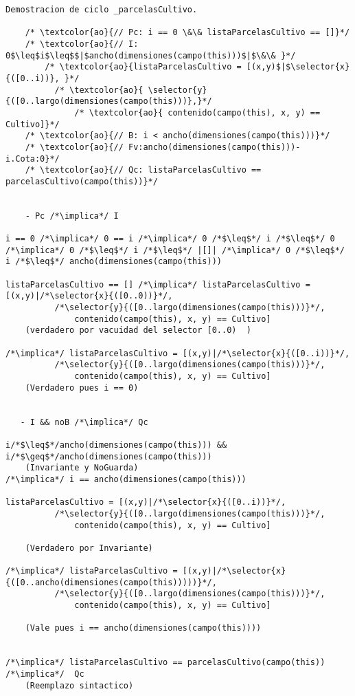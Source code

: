 \begin{lstlisting}
Demostracion de ciclo _parcelasCultivo.

    /* \textcolor{ao}{// Pc: i == 0 \&\& listaParcelasCultivo == []}*/        
  	/* \textcolor{ao}{// I: 0$\leq$i$\leq$$|$ancho(dimensiones(campo(this)))$|$\&\& }*/
    	/* \textcolor{ao}{listaParcelasCultivo = [(x,y)$|$\selector{x}{([0..i))}, }*/		
  		  /* \textcolor{ao}{ \selector{y}{([0..largo(dimensiones(campo(this)))},}*/		
    		  /* \textcolor{ao}{ contenido(campo(this), x, y) == Cultivo]}*/
    /* \textcolor{ao}{// B: i < ancho(dimensiones(campo(this)))}*/
    /* \textcolor{ao}{// Fv:ancho(dimensiones(campo(this)))-i.Cota:0}*/
    /* \textcolor{ao}{// Qc: listaParcelasCultivo == parcelasCultivo(campo(this))}*/    


    - Pc /*\implica*/ I
    
i == 0 /*\implica*/ 0 == i /*\implica*/ 0 /*$\leq$*/ i /*$\leq$*/ 0
/*\implica*/ 0 /*$\leq$*/ i /*$\leq$*/ |[]| /*\implica*/ 0 /*$\leq$*/ i /*$\leq$*/ ancho(dimensiones(campo(this)))

listaParcelasCultivo == [] /*\implica*/ listaParcelasCultivo = [(x,y)|/*\selector{x}{([0..0))}*/,	
  		  /*\selector{y}{([0..largo(dimensiones(campo(this)))}*/,
    		  contenido(campo(this), x, y) == Cultivo]
    (verdadero por vacuidad del selector [0..0)  )
    
/*\implica*/ listaParcelasCultivo = [(x,y)|/*\selector{x}{([0..i))}*/,	
  		  /*\selector{y}{([0..largo(dimensiones(campo(this)))}*/,
    		  contenido(campo(this), x, y) == Cultivo]
    (Verdadero pues i == 0)
    

   - I && noB /*\implica*/ Qc
   
i/*$\leq$*/ancho(dimensiones(campo(this))) &&  i/*$\geq$*/ancho(dimensiones(campo(this)))
	(Invariante y NoGuarda)
/*\implica*/ i == ancho(dimensiones(campo(this)))

listaParcelasCultivo = [(x,y)|/*\selector{x}{([0..i))}*/,	
  		  /*\selector{y}{([0..largo(dimensiones(campo(this)))}*/,
    		  contenido(campo(this), x, y) == Cultivo]
    
    (Verdadero por Invariante)
    
/*\implica*/ listaParcelasCultivo = [(x,y)|/*\selector{x}{([0..ancho(dimensiones(campo(this)))))}*/,	
  		  /*\selector{y}{([0..largo(dimensiones(campo(this)))}*/,
    		  contenido(campo(this), x, y) == Cultivo]
	
	(Vale pues i == ancho(dimensiones(campo(this))))    


/*\implica*/ listaParcelasCultivo == parcelasCultivo(campo(this))  /*\implica*/  Qc
	(Reemplazo sintactico)
	

\end{lstlisting}
